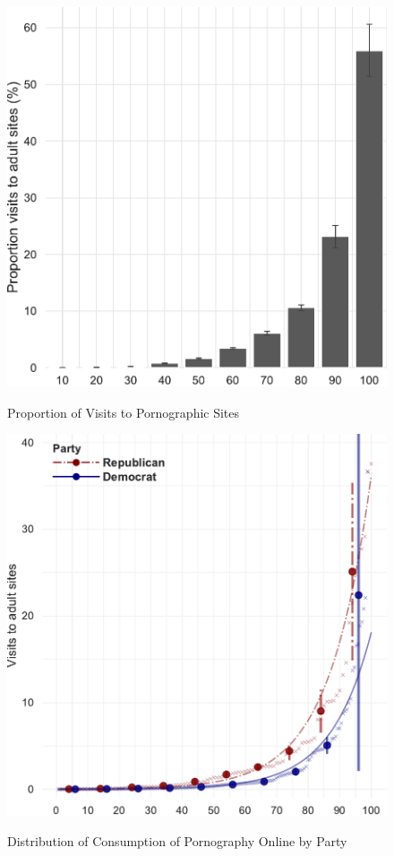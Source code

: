 \documentclass[12pt, letterpaper]{article}
\begin{document}
\begin{figure}[h]
\centering
\caption{Proportion of Visits to Pornographic Sites}
\includegraphics[scale=.75]{../figs/distribution_proportion_duration_on_adultsites.pdf}
\label{fig:distribution_prop_duration}
\end{figure}

\begin{figure}[h]
\centering
\caption{Distribution of Consumption of Pornography Online by Party}
\includegraphics[scale=.75]{../figs/distribution_duration_on_adultsites_by_party.pdf}
\label{fig:distribution_duration_party}
\end{figure}
\end{document}
